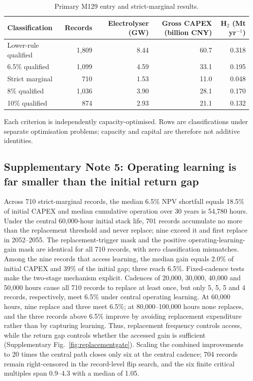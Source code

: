 \documentclass[pdflatex,sn-nature]{sn-jnl}
\begin{document}
\begin{table}[t]
\caption{Primary M129 entry and strict-marginal results.}\label{tab:headline}
\centering
\footnotesize
\begin{tabular}{lrrrr}
\toprule
Classification & Records & Electrolyser (GW) & Gross CAPEX (billion CNY) & H$_2$ (Mt yr$^{-1}$) \\
\midrule
Lower-rule qualified & 1,809 & 8.44 & 60.7 & 0.318 \\
6.5\% qualified & 1,099 & 4.59 & 33.1 & 0.195 \\
Strict marginal & 710 & 1.53 & 11.0 & 0.048 \\
8\% qualified & 1,036 & 3.90 & 28.1 & 0.170 \\
10\% qualified & 874 & 2.93 & 21.1 & 0.132 \\
\bottomrule
\end{tabular}
\begin{flushleft}\footnotesize
Each criterion is independently capacity-optimised. Rows are classifications under separate optimisation problems; capacity and capital are therefore not additive identities.
\end{flushleft}
\end{table}

\subsection*{Supplementary Note 5: Operating learning is far smaller than the initial return gap}

Across 710 strict-marginal records, the median 6.5\% NPV shortfall equals 18.5\% of initial CAPEX and median cumulative operation over 30 years is 54,780 hours. Under the central 60,000-hour initial stack life, 701 records accumulate no more than the replacement threshold and never replace; nine exceed it and first replace in 2052--2055. The replacement-trigger mask and the positive operating-learning-gain mask are identical for all 710 records, with zero classification mismatches. Among the nine records that access learning, the median gain equals 2.0\% of initial CAPEX and 39\% of the initial gap; three reach 6.5\%. Fixed-cadence tests make the two-stage mechanism explicit. Cadences of 20,000, 30,000, 40,000 and 50,000 hours cause all 710 records to replace at least once, but only 5, 5, 5 and 4 records, respectively, meet 6.5\% under central operating learning. At 60,000 hours, nine replace and three meet 6.5\%; at 80,000--100,000 hours none replaces, and the three records above 6.5\% improve by avoiding replacement expenditure rather than by capturing learning. Thus, replacement frequency controls access, while the return gap controls whether the accessed gain is sufficient (Supplementary Fig.~\ref{fig:replacementgate}). Scaling the combined improvements to 20 times the central path closes only six at the central cadence; 704 records remain right-censored in the record-level flip search, and the six finite critical multiples span 0.9--4.3 with a median of 1.05.
\end{document}
